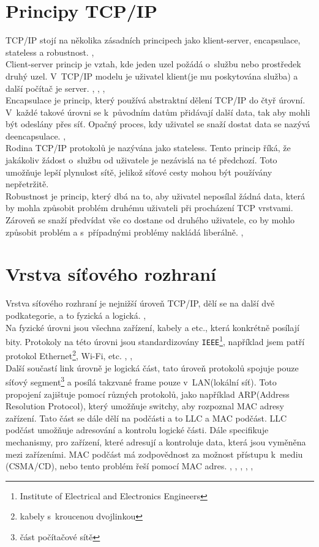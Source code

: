 \documentclass[12pt]{report}			%
\begin{document}
			\section{Principy TCP/IP}
			TCP/IP stojí na několika zásadních principech jako klient-server, encapsulace, stateless a robustnost. \cite{Princip5}, \cite{Princip4}
\\
Client-server princip je vztah, kde jeden uzel požádá o~službu nebo
 prostředek druhý uzel. V~TCP/IP modelu je uživatel klient(je mu poskytována služba) a další počítač je server. \cite{zakladykomunikace1}, \cite{Princip5}, \cite{Princip1}, \cite{Princip3}
\\
Encapsulace je princip, který používá abstraktní dělení TCP/IP do čtyř úrovní. V~každé takové úrovni se k~původním datům přidávají další data, tak aby mohli být odeslány přes síť. Opačný proces, kdy uživatel se snaží dostat data se nazývá deencapsulace. \cite{zakladykomunikace1}, \cite{Princip5} 
\\
Rodina TCP/IP protokolů je nazývána jako stateless. Tento princip říká, že jakákoliv žádost o~službu od uživatele je nezávislá na té předchozí. Toto umožňuje lepší plynulost sítě, jelikož síťové cesty mohou být používány nepřetržitě. \cite{Princip5}
\\
Robustnost je princip, který dbá na to, aby uživatel neposílal žádná data, která by mohla způsobit problém druhému uživateli při procházení TCP vrstvami. Zároveň se snaží předvídat vše co dostane od druhého uživatele, co by mohlo způsobit problém a s~případnými problémy nakládá liberálně. \cite{Princip5}, \cite{Princip6}
			
			
			\section{Vrstva síťového rozhraní}
			Vrstva síťového rozhraní je nejnižší úroveň TCP/IP, dělí se na další dvě podkategorie, a to fyzická a logická. \cite{Princip5}, \cite{Link4}
\\
Na fyzické úrovni jsou všechna zařízení, kabely a etc., která konkrétně posílají bity. Protokoly na této úrovni jsou standardizovány \texttt{IEEE}\footnote{Institute of Electrical and Electronics Engineers}, například jsem patří protokol Ethernet\footnote{kabely s~kroucenou dvojlinkou}, Wi-Fi, etc. \cite{Princip5}, \cite{Link2}, \cite{Link3}
 \\
Další součastí link úrovně je logická část, tato úroveň protokolů spojuje pouze síťový segment\footnote{část počítačové sítě} a posílá takzvané frame pouze v~LAN(lokální síť). Toto propojení zajištuje pomocí různých protokolů, jako například ARP(Address Resolution Protocol), který umožňuje switchy, aby rozpoznal MAC adresy zařízení. Tato část se dále dělí na podčásti a to LLC a MAC podčást. LLC podčást umožňuje adresování a kontrolu logické části. Dále specifikuje mechanismy, pro zařízení, které adresují a kontroluje data, která jsou vyměněna mezi zařízeními. MAC podčást má zodpovědnost za možnost přístupu k~mediu (CSMA/CD), nebo tento problém řeší pomocí MAC adres. \cite{Princip5}, \cite{Link2}, \cite{Link3}, \cite{Link4}, \cite{Link5}, \cite{Link6}
\end{document}
